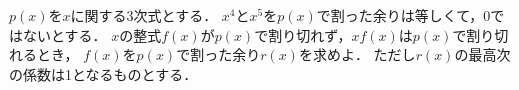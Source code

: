 \documentclass[../../main.tex]{subfiles}
\begin{document}
$p(x)$を$x$に関する3次式とする．
$x^4$と$x^5$を$p(x)$で割った余りは等しくて，0ではないとする．
$x$の整式$f(x)$が$p(x)$で割り切れず，$xf(x)$は$p(x)$で割り切れるとき，
$f(x)$を$p(x)$で割った余り$r(x)$を求めよ．
ただし$r(x)$の最高次の係数は1となるものとする．
\end{document}

